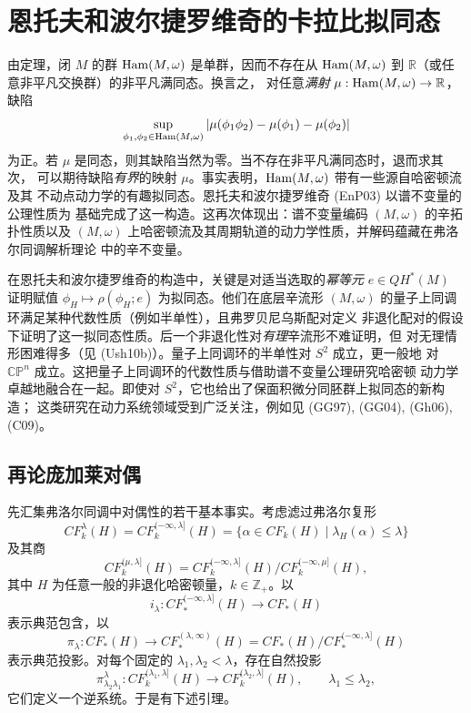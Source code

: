 \section{恩托夫和波尔捷罗维奇的卡拉比拟同态}

由\personBanyaga{}定理，闭 $M$ 的群 $\operatorname{Ham}(M,\omega)$ 是单群，因而不存在从
$\operatorname{Ham}(M,\omega)$ 到 $\mathbb R$（或任意非平凡交换群）的非平凡满同态。换言之，
对任意\emph{满射} $\mu:\operatorname{Ham}(M,\omega)\to\mathbb R$，缺陷
\[
 \sup_{\phi_1,\phi_2\in\operatorname{Ham}(M,\omega)}
 |\mu(\phi_1\phi_2)-\mu(\phi_1)-\mu(\phi_2)|
\]
为正。若 $\mu$ 是同态，则其缺陷当然为零。当不存在非平凡满同态时，退而求其次，
可以期待缺陷\emph{有界}的映射 $\mu$。事实表明，$\operatorname{Ham}(M,\omega)$ 带有一些源自哈密顿流及其
不动点动力学的有趣拟同态。恩托夫和波尔捷罗维奇 (EnP03) 以谱不变量的公理性质为
基础完成了这一构造。这再次体现出：谱不变量编码 $(M,\omega)$ 的辛拓扑性质以及
$(M,\omega)$ 上哈密顿流及其周期轨道的动力学性质，并解码蕴藏在弗洛尔同调解析理论
中的辛不变量。

在恩托夫和波尔捷罗维奇的构造中，关键是对适当选取的\emph{幂等元}
$e\in QH^*(M)$ 证明赋值 $\phi_H\mapsto\rho(\phi_H;e)$ 为拟同态。他们在底层辛流形
$(M,\omega)$ 的量子上同调环满足某种代数性质（例如半单性），且弗罗贝尼乌斯配对定义
非退化配对的假设下证明了这一拟同态性质。后一个非退化性对\emph{有理}辛流形不难证明，但
对无理情形困难得多（见 (Ush10b)）。量子上同调环的半单性对 $S^2$ 成立，更一般地
对 $\mathbb{CP}^n$ 成立。这把量子上同调环的代数性质与借助谱不变量公理研究哈密顿
动力学卓越地融合在一起。即使对 $S^2$，它也给出了保面积微分同胚群上拟同态的新构造；
这类研究在动力系统领域受到广泛关注，例如见 (GG97), (GG04), (Gh06), (C09)。

\subsection{再论庞加莱对偶}

先汇集弗洛尔同调中对偶性的若干基本事实。考虑滤过弗洛尔复形
\[
 CF_k^\lambda(H)=CF_k^{(-\infty,\lambda]}(H)
 =\{\alpha\in CF_k(H)\mid\lambda_H(\alpha)\leq\lambda\}
\]
及其商
\[
 CF_k^{(\mu,\lambda]}(H)
 =CF_k^{(-\infty,\lambda]}(H)/CF_k^{(-\infty,\mu]}(H),
\]
其中 $H$ 为任意一般的非退化哈密顿量，$k\in\mathbb Z_+$。以
\[
 i_\lambda:CF_*^{(-\infty,\lambda]}(H)\longrightarrow CF_*(H)
\]
表示典范包含，以
\[
 \pi_\lambda:CF_*(H)\longrightarrow CF_*^{(\lambda,\infty)}(H)
 =CF_*(H)/CF_*^{(-\infty,\lambda]}(H)
\]
表示典范投影。对每个固定的 $\lambda_1,\lambda_2<\lambda$，存在自然投影
\[
 \pi^\lambda_{\lambda_2\lambda_1}:CF_k^{(\lambda_1,\lambda]}(H)
 \longrightarrow CF_k^{(\lambda_2,\lambda]}(H),
 \qquad \lambda_1\leq\lambda_2,
\]
它们定义一个逆系统。于是有下述引理。

